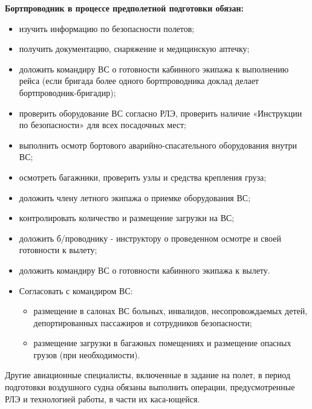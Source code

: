 \textbf{Бортпроводник в процессе предполетной подготовки обязан:}
\begin{itemize}
    \item	изучить информацию по безопасности полетов;
    \item	получить документацию, снаряжение и медицинскую аптечку;
    \item	доложить командиру ВС о готовности кабинного экипажа к выполнению рейса (если бригада более одного бортпроводника доклад делает бортпроводник-бригадир); 
    \item	проверить оборудование ВС согласно РЛЭ, проверить наличие «Инструкции по безопасности» для всех посадочных мест;
    \item	выполнить осмотр бортового аварийно-спасательного оборудования внутри ВС;
    \item	осмотреть багажники, проверить узлы и средства крепления груза;
    \item	доложить члену летного экипажа о приемке оборудования ВС; 
    \item	контролировать количество и размещение загрузки на ВС;
    \item	доложить б/проводнику - инструктору о проведенном осмотре и своей готовности к вылету;
    \item	доложить командиру ВС о готовности кабинного экипажа к вылету.
    \item Согласовать с командиром ВС:
    \begin{itemize}  
        \item размещение в салонах ВС больных, инвалидов, несопровождаемых детей, депортированных пассажиров и сотрудников безопасности; 
        \item размещение загрузки в багажных помещениях и размещение опасных грузов (при необходимости).
    \end{itemize}
\end{itemize}

Другие авиационные специалисты, включенные в задание на полет, в период подготовки воздушного судна обязаны выполнить операции, предусмотренные РЛЭ и технологией работы, в части их каса-ющейся.

